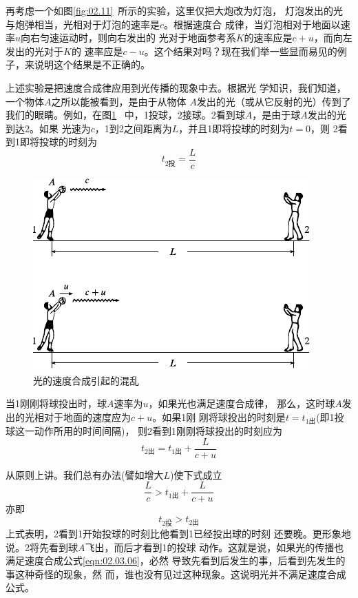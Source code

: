 再考虑一个如图\ref{fig:02.11}~所示的实验，这里仅把大炮改为灯泡，
灯泡发出的光与炮弹相当，光相对于灯泡的速率是$c$。根据速度合
成律，当灯泡相对于地面以速率$u$向右匀速运动时，则向右发出的
光对于地面参考系$K$的速率应是$c+u$，而向左发出的光对于$K$的
速率应是$c-u$。这个结果对吗？现在我们举一些显而易见的例
子，来说明这个结果是不正确的。

上述实验是把速度合成律应用到光传播的现象中去。根据光
学知识，我们知道，一个物体$A$之所以能被看到，是由于从物体
$A$发出的光（或从它反射的光）传到了我们的眼睛。例如，在图\ref{fig:02.12}~
中，1投球，2接球。2看到球$A$，是由于球$A$发出的光到达2。如果
光速为$c$，1到2之间距离为$L$，并且1即将投球的时刻为$t=0$，则
2看到1即将投球的时刻为
\begin{equation*}
  t_{2\text{投}}=\frac{L}{c}
\end{equation*}
\begin{figure}
  \centering
  \includegraphics{figure/fig02.12}
  \caption{光的速度合成引起的混乱}
  \label{fig:02.12}
\end{figure}%
当1刚刚将球投出时，球$A$速率为$u$，如果光也满足速度合成律，
那么，这时球$A$发出的光相对于地面的速度应为$c+u$。如果1刚
刚将球投出的时刻是$t=t_{1\text{出}}$(即1投球这一动作所用的时间间隔)，
则2看到1刚刚将球投出的时刻应为
\begin{equation*}
  t_{2\text{出}} = t_{1\text{出}} + \frac{L}{c+u}
\end{equation*}

从原则上讲。我们总有办法(譬如增大$L$)使下式成立
\begin{equation*}
  \frac{L}{c} > t_{1\text{出}} + \frac{L}{c+u}
\end{equation*}
亦即
\begin{equation*}
  t_{2\text{投}} > t_{2\text{出}}
\end{equation*}
上式表明，2看到1开始投球的时刻比他看到1已经投出球的时刻
还要晚。更形象地说。2将先看到球$A$飞出，而后才看到1的投球
动作。这就是说，如果光的传播也满足速度合成公式\eqref{eqn:02.03.06}，必然
导致先看到后发生的事，后看到先发生的事这种奇怪的现象，然
而，谁也没有见过这种现象。这说明光并不满足速度合成公式。

